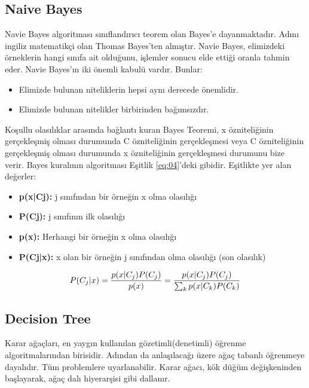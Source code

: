 \documentclass[conference]{IEEEtran}
\begin{document}
\subsection{\textbf{Naive Bayes}}
\quad Navie Bayes algoritması sınıflandırıcı teorem olan Bayes’e dayanmaktadır\cite{15}.  Adını ingiliz matematikçi olan Thomas Bayes’ten almıştır\cite{14}. Navie Bayes, elimizdeki örneklerin hangi sınıfa ait olduğunu, işlemler sonucu elde ettiği oranla tahmin eder. Navie Bayes’ın iki önemli kabulü vardır\cite{15}. Bunlar:
\begin{itemize}
\item Elimizde bulunan niteliklerin hepsi aynı derecede önemlidir.
\item Elimizde bulunan nitelikler birbirinden bağımsızdır.
\end{itemize}

\quad Koşullu olasılıklar arasında bağlantı kuran Bayes Teoremi, x özniteliğinin gerçekleşmiş olması durumunda C özniteliğinin gerçekleşmesi veya C özniteliğinin gerçekleşmiş olması durumunda x özniteliğinin gerçekleşmesi durumunu bize verir\cite{15}. Bayes kuralının algoritması Eşitlik \ref{eq:04}'deki gibidir. Eşitlikte yer alan değerler\cite{14}:

\begin{itemize}
\item \textbf{p(x|Cj):} j sınıfından bir örneğin x olma olasılığı
\item \textbf{P(Cj):} j sınıfının ilk olasılığı
\item \textbf{p(x):} Herhangi bir örneğin x olma olasılığı
\item \textbf{P(Cj|x):} x olan bir örneğin j sınıfından olma olasılığı (son olasılık)
\end{itemize}

\begin{equation}
\label{eq:04}
\Large P(C_{j}|x) = \frac {p(x|C_{j}) P(C_{j})} {p(x)} = \frac {p(x|C_{j}) P(C_{j})} {\sum_{k}^{}p(x|C_{k})P(C_{k})}
\end{equation}

\subsection{\textbf{Decision Tree}}
\quad Karar ağaçları, en yaygın kullanılan gözetimli(denetimli) öğrenme algoritmalarından birisidir. Adından da anlaşılacağı üzere ağaç tabanlı öğrenmeye dayalıdır. Tüm problemlere uyarlanabilir\cite{16}. Karar ağacı, kök düğüm değişkeninden başlayarak, ağaç dalı hiyerarşisi gibi dallanır\cite{17}.
\end{document}
